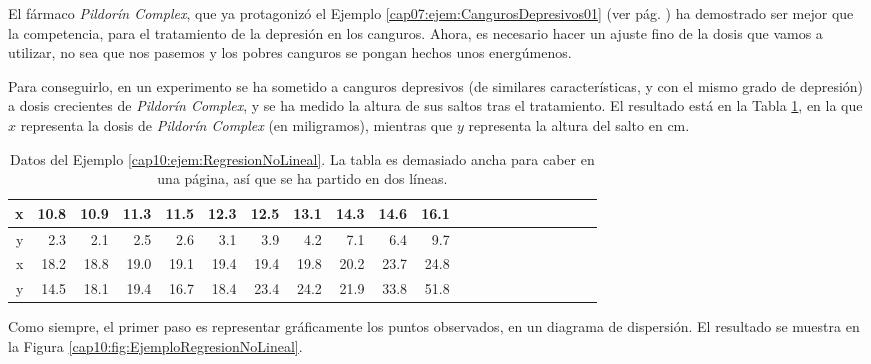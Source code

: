 \begin{ejemplo}
\label{cap10:ejem:RegresionNoLineal}
El fármaco {\em Pildorín Complex}, que ya protagonizó el Ejemplo \ref{cap07:ejem:CangurosDepresivos01} (ver pág. \pageref{cap07:ejem:CangurosDepresivos01}) ha demostrado ser mejor que la competencia, para el tratamiento de la depresión en los canguros.  Ahora, es necesario hacer un ajuste fino de la dosis que vamos a utilizar, no sea que nos pasemos y los pobres canguros se pongan hechos unos energúmenos.

Para conseguirlo, en un experimento se ha sometido a canguros depresivos (de similares características, y con el mismo grado de depresión) a dosis crecientes de {\em Pildorín Complex}, y se ha medido la altura de sus saltos tras el tratamiento. El resultado está en la Tabla \ref{cap10:tabla:EjemploRegresionNoLineal01}, en la que $x$ representa la dosis de {\em Pildorín Complex} (en miligramos), mientras que $y$ representa la altura del salto en cm.

\begin{table}[htb]
\centering
\begin{tabular}{rrrrrrrrrrrrrrrrrrrrr}
  \hline
  \hline
    x & 10.8 & 10.9 & 11.3 & 11.5 & 12.3 & 12.5 & 13.1 & 14.3 & 14.6 & 16.1 \\
  \hline
    y & 2.3 & 2.1 & 2.5 & 2.6 & 3.1 & 3.9 & 4.2 & 7.1 & 6.4 & 9.7 & \\
  \hline
  \hline
    x & 18.2 & 18.8 & 19.0 & 19.1 & 19.4 & 19.4 & 19.8 & 20.2 & 23.7 & 24.8 \\
  \hline
    y & 14.5 & 18.1 & 19.4 & 16.7 & 18.4 & 23.4 & 24.2 & 21.9 & 33.8 & 51.8 \\
  \hline
  \hline
\end{tabular}
\caption{Datos del Ejemplo \ref{cap10:ejem:RegresionNoLineal}. La tabla es demasiado ancha para caber en una página, así que se ha partido en dos líneas.}
\label{cap10:tabla:EjemploRegresionNoLineal01}
\end{table}
Como siempre, el primer paso es representar gráficamente los puntos observados, en un diagrama de dispersión. El resultado se muestra en la Figura \ref{cap10:fig:EjemploRegresionNoLineal}.


\end{ejemplo}
